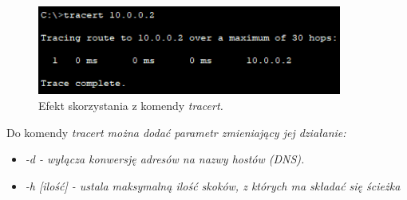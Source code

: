 \documentclass[a4paper,12pt]{article}
\newcommand{\italic}[1]{\it #1 \rm}
\begin{document}
\begin{figure}[H]
	\centering
	\includegraphics[width=10cm]{fig3.png}
	\caption{Efekt skorzystania z komendy \it tracert\rm.}
\end{figure}

Do komendy \italic{tracert} można dodać parametr zmieniający jej działanie:
\begin{itemize}
	\item \italic{-d} - wyłącza konwersję adresów na nazwy hostów (DNS).
	\item \italic{-h [ilość]} - ustala maksymalną ilość skoków, z których ma składać się ścieżka
\end{itemize}
	
\end{document}
